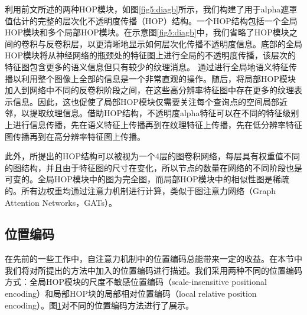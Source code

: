 利用前文所述的两种HOP模块，如图\ref{fig5:diagb}所示，我们构建了用于alpha遮罩值估计的完整的层次化不透明度传播（HOP）结构。一个HOP结构包括一个全局HOP模块和多个局部HOP模块。在示意图\ref{fig5:diagb}中，我们省略了HOP模块之间的卷积与反卷积层，以更清晰地显示如何层次化传播不透明度信息。底部的全局HOP模块将从神经网络的瓶颈处的特征图上进行全局的不透明度传播，该层次的特征图包含更多的语义信息但只有较少的纹理消息。
通过进行全局地语义特征传播以利用整个图像上全部的信息是一个非常直观的操作。随后，将局部HOP模块加入到网络中不同的反卷积阶段之间，在这些高分辨率特征图中存在更多的纹理表示信息。因此，这也促使了局部HOP模块仅需要关注每个查询点的空间局部近邻，以提取纹理信息。借助HOP结构，不透明度alpha特征可以在不同的特征级别上进行信息传播，先在语义特征上传播再到在纹理特征上传播，先在低分辨率特征图传播再到在高分辨率特征图上传播。

此外，所提出的HOP结构可以被视为一个4层的图卷积网络\cite{kipf2016semi}，每层具有权重值不同的图结构，并且由于特征图的尺寸在变化，所以节点的数量在网络的不同阶段也是可变的。全局HOP模块中的图为完全图，而局部HOP模块中的相似性图是稀疏的。所有边权重均通过注意力机制进行计算，类似于图注意力网络（Graph Attention Networks，GATs）\cite{velivckovic2017graph}。

\subsection{位置编码}
在先前的一些工作中，自注意力机制中的位置编码总能带来一定的收益\cite{vaswani2017attention,dai2019transformer,ramachandran2019stand}。在本节中我们将对所提出的方法中加入的位置编码进行描述。我们采用两种不同的位置编码方式：全局HOP模块的尺度不敏感位置编码（scale-insensitive positional encoding）和局部HOP块的局部相对位置编码（local relative position encoding）。图\ref{fig5:PE}对不同的位置编码方法进行了展示。

\begin{figure}[t]
	\label{fig5:PE}
\end{figure}

